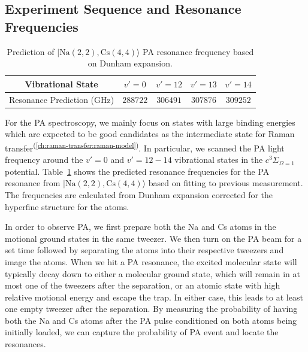 \subsection{Experiment Sequence and Resonance Frequencies}
\label{pa:sequence-res}

\begin{table}
  \centering
  \begin{tabular}{|c|c|c|c|c|}
    \hline
    Vibrational State&$v'=0$&$v'=12$&$v'=13$&$v'=14$\\\hline
    Resonance Prediction (GHz)&$288722$&$306491$&$307876$&$309252$\\\hline
  \end{tabular}
  \caption[PA resonance prediction]{
    Prediction of $|\mathrm{Na(2, 2),Cs(4, 4)}\rangle$ PA resonance frequency
    based on Dunham expansion\cite{grochola_spin-forbidden_2011,dunham_energy_1932}.
    \label{table:pa:theory-prediction}}
\end{table}

For the PA spectroscopy, we mainly focus on states with large binding energies
which are expected to be good candidates as the intermediate state
for Raman transfer\textsuperscript{(\ref{ch:raman-transfer:raman-model})}.
In particular, we scanned the PA light frequency around the $v'=0$ and $v'=12-14$
vibrational states in the $c^3\Sigma_{\Omega=1}$ potential.
Table~\ref{table:pa:theory-prediction} shows the predicted resonance frequencies
for the PA resonance from $|\mathrm{Na(2, 2),Cs(4, 4)}\rangle$
based on fitting to previous measurement\cite{grochola_spin-forbidden_2011}.
The frequencies are calculated from Dunham expansion\cite{dunham_energy_1932}
corrected for the hyperfine structure for the atoms.

In order to observe PA, we first prepare both the Na and Cs atoms in the motional ground states
in the same tweezer\cite{liu_building_2018}.
We then turn on the PA beam for a set time
followed by separating the atoms into their respective tweezers and image the atoms.
When we hit a PA resonance, the excited molecular state will typically decay down
to either a molecular ground state,
which will remain in at most one of the tweezers after the separation,
or an atomic state with high relative motional energy and escape the trap.
In either case, this leads to at least one empty tweezer after the separation.
By measuring the probability of having both the Na and Cs atoms after the PA pulse
conditioned on both atoms being initially loaded,
we can capture the probability of PA event and locate the resonances.

